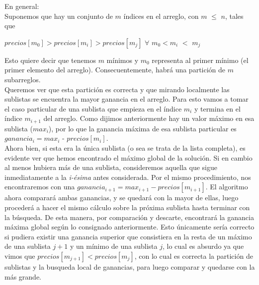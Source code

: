 \indent En general:\\
\indent Suponemos que hay un conjunto de $m$ índices en el arreglo, con $m$
$\leq$ $n$, tales que 
\begin{center}
 $precios[m_0] > precios[m_i] > precios[m_j]$ $\forall$ $m_0 < m_i$ $<$ $m_j$ 
\end{center}
Esto quiere decir que tenemos $m$ mínimos y $m_0$ representa al primer mínimo (el primer elemento del arreglo). Consecuentemente, habrá una partición de $m$ subarreglos. \\
\indent Queremos ver que esta partición es correcta y que
mirando localmente las sublistas se encuentra la mayor ganancia en el arreglo. Para esto vamos a
tomar el caso particular de una sublista que empieza en el índice $m_i$ y
termina en el índice $m_{i+1}$ del arreglo. Como dijimos anteriormente hay un
valor máximo en esa sublista ($max_i$), por lo que la ganancia máxima de esa
sublista particular es $ganancia_i = max_i$ -  $precios[m_i]$. \\
\indent Ahora bien, si esta era la única sublista (o sea se trata de la lista completa), es evidente ver que hemos encontrado el máximo global de la solución. Si en cambio al menos hubiera más de una sublista, consideremos aquella que sigue inmediatamente a la \textit{i-ésima} antes considerada. Por el mismo procedimiento, nos encontraremos con una $ganancia_{i+1} = max_{i+1} - precios[m_{i+1}]$. El algoritmo ahora comparará ambas ganancias, y se quedará con la mayor de ellas, luego procederá a hacer el mismo cálculo sobre la próxima sublista hasta terminar con la búsqueda. De esta manera, por comparación y descarte, encontrará la ganancia máxima global según lo consignado anteriormente. Esto únicamente sería correcto si pudiera existir una ganancia superior que consistiera en la resta de un máximo de una sublista $j+1$ y un mínimo de una sublista $j$, lo cual es absurdo ya que vimos que $precios[m_{j+1}] < precios[m_j]$, con lo cual es correcta la partición de sublistas y la busqueda local de ganancias, para luego comparar y quedarse con la más grande.

